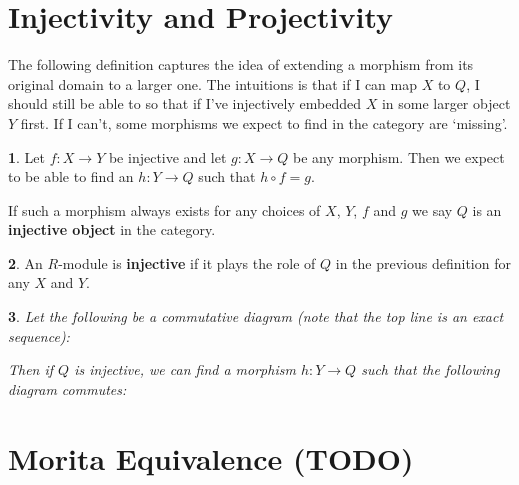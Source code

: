\documentclass[oneside,english]{amsbook}
\numberwithin{section}{chapter}
\theoremstyle{plain}
\newtheorem{thm}{\protect\theoremname}
\theoremstyle{definition}
\newtheorem{defn}[thm]{\protect\definitionname}
\providecommand{\definitionname}{Definition}
\providecommand{\theoremname}{Theorem}
\begin{document}
		\section{Injectivity and Projectivity}
		
			The following definition captures the idea of extending a morphism from its original domain to a larger one. The intuitions is that if I can map $X$ to $Q$, I should still be able to so that if I've injectively embedded $X$ in some larger object $Y$ first. If I can't, some morphisms we expect to find in the category are `missing'.
					
			\begin{defn}
				Let $f:X\to Y$ be injective and let $g:X\to Q$ be any morphism. Then we expect to be able to find an $h:Y\to Q$ such that $h\circ f = g$. 
				\begin{center}
				\end{center}					
				If such a morphism always exists for any choices of $X$, $Y$, $f$ and $g$ we say $Q$ is an \textbf{injective object} in the category. 
			\end{defn}
			
			\begin{defn}
				An $R$-module is \textbf{injective} if it plays the role of $Q$ in the previous definition for any $X$ and $Y$.
			\end{defn}

			\begin{thm}
				Let the following be a commutative diagram (note that the top line is an exact sequence):
				\begin{center}
				\end{center}
				Then if $Q$ is injective, we can find a morphism $h:Y\to Q$ such that the following diagram commutes:
				\begin{center}
				\end{center}
			\end{thm}
			
		\section{Morita Equivalence (TODO)}
		
\end{document}

